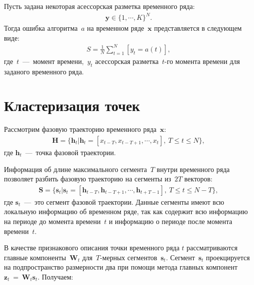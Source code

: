 \documentclass[12pt, twoside]{article}
\numberwithin{equation}{section}
\begin{document}
Пусть задана некоторая асессорская разметка временного ряда:
\begin{equation}
\label{eq:st:6}
\begin{aligned}
\textbf{y} \in \{1,\cdots,K\}^{N}.
\end{aligned}
\end{equation}
Тогда ошибка алгоритма~$a$ на временном ряде~$\textbf{x}$ представляется в следующем виде:
\begin{equation}
\label{eq:st:7}
\begin{aligned}
S = \frac{1}{N}\sum_{t=1}^{N}[y_t = a\left(t\right)],
\end{aligned}
\end{equation}
где~$t$~---~момент времени,~$y_t$ асессорская разметка~$t$-го момента времени для заданого временного ряда.

\section{Кластеризация точек}
Рассмотрим фазовую траекторию временного ряда~$\textbf{x}$:
\begin{equation}
\label{eq:cl:1}
\begin{aligned}
\mathbf{H} = \{\textbf{h}_t| \textbf{h}_t = [x_{t-T}, x_{t-T+1}, \cdots, x_{t}],~T\leq t\leq N\},
\end{aligned}
\end{equation}
где $\textbf{h}_t$~---~точка фазовой траектории.

Информация об длине максимального сегмента~$T$ внутри временного ряда позволяет разбить фазовую траекторию на сегменты из~$2T$ векторов:
\begin{equation}
\label{eq:cl:2}
\begin{aligned}
\mathbf{S} = \{\textbf{s}_t| \textbf{s}_t = [\textbf{h}_{t-T}, \textbf{h}_{t-T+1}, \cdots, \textbf{h}_{t+T-1}],~T\leq t\leq N-T\},
\end{aligned}
\end{equation}
где $\textbf{s}_t$~---~это сегмент фазовой траектории. Данные сегменты имеют всю локальную информацию об временном ряде, так как содержит всю информацию на периоде до момента времени~$t$ и информацию о периоде после момента времени~$t$.

В качестве признакового описания точки временного ряда $t$ рассматриваются главные компоненты~$\textbf{W}_t$ для~$T\text{-мерных}$ сегментов~$\textbf{s}_t$. Сегмент~$\textbf{s}_t$ проекцируется на подпространство размерности два при помощи метода главных  компонент~$\textbf{z}_t~=~\textbf{W}_t\textbf{s}_t$. Получаем:
\end{document}
